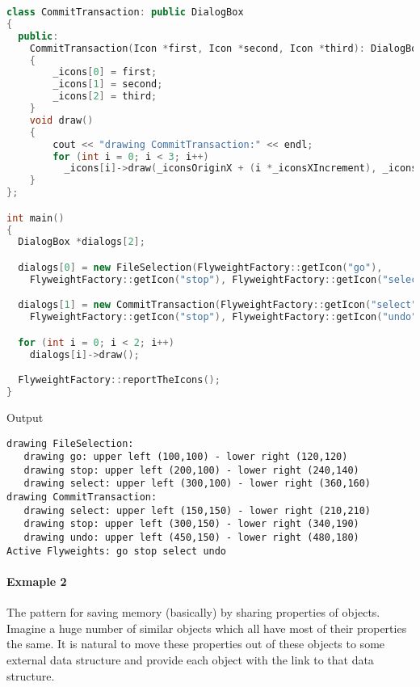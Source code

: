 \documentclass{book}
\begin{document}
\begin{lstlisting}[caption={Flyweight Pattern sample 1},language=C++]
class CommitTransaction: public DialogBox
{
  public:
    CommitTransaction(Icon *first, Icon *second, Icon *third): DialogBox(150, 150, 150)
    {
        _icons[0] = first;
        _icons[1] = second;
        _icons[2] = third;
    }
    void draw()
    {
        cout << "drawing CommitTransaction:" << endl;
        for (int i = 0; i < 3; i++)
          _icons[i]->draw(_iconsOriginX + (i *_iconsXIncrement), _iconsOriginY);
    }
};

int main()
{
  DialogBox *dialogs[2];

  dialogs[0] = new FileSelection(FlyweightFactory::getIcon("go"),
    FlyweightFactory::getIcon("stop"), FlyweightFactory::getIcon("select"));

  dialogs[1] = new CommitTransaction(FlyweightFactory::getIcon("select"),
    FlyweightFactory::getIcon("stop"), FlyweightFactory::getIcon("undo"));

  for (int i = 0; i < 2; i++)
    dialogs[i]->draw();

  FlyweightFactory::reportTheIcons();
}
\end{lstlisting}
Output
\begin{verbatim}
drawing FileSelection:
   drawing go: upper left (100,100) - lower right (120,120)
   drawing stop: upper left (200,100) - lower right (240,140)
   drawing select: upper left (300,100) - lower right (360,160)
drawing CommitTransaction:
   drawing select: upper left (150,150) - lower right (210,210)
   drawing stop: upper left (300,150) - lower right (340,190)
   drawing undo: upper left (450,150) - lower right (480,180)
Active Flyweights: go stop select undo 
\end{verbatim}

\paragraph{Exmaple 2}

The pattern for saving memory (basically) by sharing properties of objects.
Imagine a huge number of similar objects which all have most of their properties the same.
It is natural to move these properties out of these objects to some external data structure and provide each object with the link to that data structure.
\end{document}

